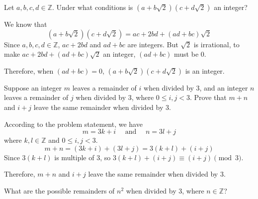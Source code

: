 \begin{chapex}
\label{cqProductInZSqrtTwoEqualsInteger}
Let $a, b, c, d \in \mathbb{Z}$. Under what conditions is $(a+b\sqrt{2})(c+d\sqrt{2})$ an integer?
\end{chapex}

\begin{mysolution}
    We know that
    \[(a+b\sqrt{2})(c+d\sqrt{2}) = ac + 2bd + (ad+bc)\sqrt{2}\]
    Since $a, b, c, d \in \mathbb{Z}$, $ac+2bd$ and $ad+bc$ are integers. But $\sqrt{2}$ is irrational, to make $ac + 2bd + (ad+bc)\sqrt{2}$ an integer, $(ad+bc)$ must be $0$. 
    
    Therefore, when $(ad+bc) = 0$, $(a+b\sqrt{2})(c+d\sqrt{2})$ is an integer.
\end{mysolution}

\begin{chapex}
\label{cqSumOfRemaindersModulo3}
Suppose an integer $m$ leaves a remainder of $i$ when divided by $3$, and an integer $n$ leaves a remainder of $j$ when divided by $3$, where $0 \le i,j < 3$. Prove that $m+n$ and $i+j$ leave the same remainder when divided by $3$.
\end{chapex}

\begin{myproof}
    According to the problem statement, we have
    \[m = 3k + i \quad \text{ and } \quad n = 3l + j\]
    where $k, l \in \mathbb{Z}$ and $0 \le i,j < 3$.
    \[m+n = (3k + i)+(3l + j) = 3(k+l) + (i+j)\]
    Since $3(k+l)$ is multiple of $3$, so $3(k+l) + (i+j) \equiv (i+j) \pmod 3$. 
    
    Therefore, $m+n$ and $i+j$ leave the same remainder when divided by $3$.
\end{myproof}

\begin{chapex}
\label{cqRemaindersOfNSquared}
What are the possible remainders of $n^2$ when divided by $3$, where $n \in \mathbb{Z}$?
\end{chapex}


